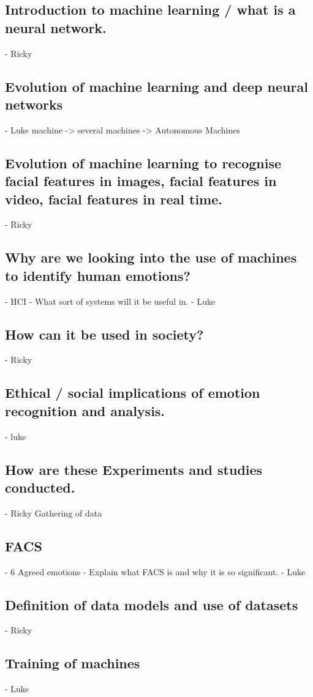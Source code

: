 \documentclass[a4paper, twoside, 11pt]{article}
\begin{document}
	\subsection{Introduction to machine  learning / what is a neural network.} - Ricky
	\subsection{Evolution of machine learning  and deep neural networks} - Luke
	 machine -> several machines -> Autonomous Machines
	
	
	\subsection{ Evolution of machine learning  to recognise facial features in images, facial features in video, facial  features in real time.} - Ricky
	
	\subsection{ Why are we looking into the  use of machines to identify human emotions?} - HCI - What sort of systems  will it be useful in. - Luke
	\subsection{How can it be used in society? }- Ricky
	\subsection{Ethical / social implications  of emotion recognition and analysis.} - luke
	\subsection{How are these Experiments and  studies conducted.}- Ricky
	Gathering of data
	\subsection{FACS} - 6 Agreed emotions -  Explain what FACS is and why it is so significant. - Luke
	\subsection{Definition of data models  and use of datasets} - Ricky
	\subsection{Training of machines} - Luke
\end{document}

